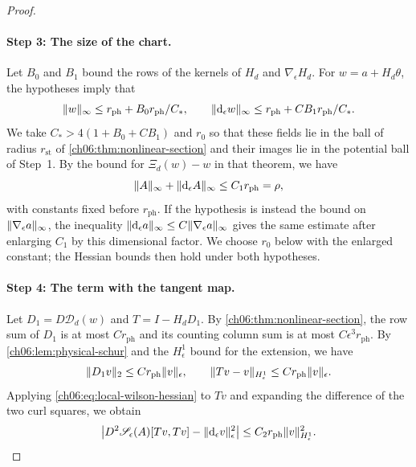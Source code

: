 \begin{proof}
\paragraph{Step 3: The size of the chart.}
Let $B_0$ and $B_1$ bound the rows of the kernels of $H_d$ and $\nabla_\epsilon H_d$. For $w=a+H_d\theta$, the hypotheses imply that
\[
 \lVert w\rVert_\infty\le r_{\mathrm{ph}}+B_0r_{\mathrm{ph}}/C_*,\qquad\lVert \mathrm d_\epsilon w\rVert_\infty\le r_{\mathrm{ph}}+CB_1r_{\mathrm{ph}}/C_*.
\]
We take $C_*>4(1+B_0+CB_1)$ and $r_0$ so that these fields lie in the ball of radius $r_{\mathrm{st}}$ of \cref{ch06:thm:nonlinear-section} and their images lie in the potential ball of Step~1. By the bound for $\Xi_d(w)-w$ in that theorem, we have
\begin{equation}\label{ch06:eq:curl-chart-image}
 \lVert A\rVert_\infty+\lVert \mathrm d_\epsilon A\rVert_\infty\le C_1r_{\mathrm{ph}}=\rho,
\end{equation}
with constants fixed before $r_{\mathrm{ph}}$. If the hypothesis is instead the bound on $\lVert \nabla_\epsilon a\rVert_\infty$, the inequality $\lVert \mathrm d_\epsilon a\rVert_\infty\le C\lVert \nabla_\epsilon a\rVert_\infty$ gives the same estimate after enlarging $C_1$ by this dimensional factor. We choose $r_0$ below with the enlarged constant; the Hessian bounds then hold under both hypotheses.

\paragraph{Step 4: The term with the tangent map.}
Let $D_1=D\mathscr D_d(w)$ and $T=I-H_dD_1$. By \cref{ch06:thm:nonlinear-section}, the row sum of $D_1$ is at most $Cr_{\mathrm{ph}}$ and its counting column sum is at most $C\epsilon^3r_{\mathrm{ph}}$. By \cref{ch06:lem:physical-schur} and the $H^1_\epsilon$ bound for the extension, we have
\begin{equation}\label{ch06:eq:tangent-correction}
 \lVert D_1v\rVert_2\le Cr_{\mathrm{ph}}\lVert v\rVert_\epsilon,\qquad\lVert Tv-v\rVert_{H^1_\epsilon}\le Cr_{\mathrm{ph}}\lVert v\rVert_\epsilon.
\end{equation}
Applying \eqref{ch06:eq:local-wilson-hessian} to $Tv$ and expanding the difference of the two curl squares, we obtain
\begin{equation}\label{ch06:eq:first-hessian-term}
 \bigl\lvert D^2\mathscr S_\epsilon(A)[Tv,Tv]-\lVert \mathrm d_\epsilon v\rVert_\epsilon^2\bigr\rvert\le C_2r_{\mathrm{ph}}\lVert v\rVert_{H^1_\epsilon}^2.
\end{equation}


\end{proof}
